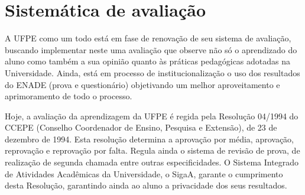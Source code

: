 \chapter{Sistemática de avaliação}
\label{cap9}

A UFPE como um todo está em fase de renovação de seu sistema de avaliação, buscando implementar neste uma avaliação que observe não só o aprendizado do aluno como também a sua opinião quanto às práticas pedagógicas adotadas na Universidade. Ainda, está em processo de institucionalização o uso dos resultados do ENADE (prova e questionário) objetivando um melhor aproveitamento e aprimoramento de todo o processo.

Hoje, a avaliação da aprendizagem da UFPE é regida pela Resolução 04/1994 do CCEPE (Conselho Coordenador de Ensino, Pesquisa e Extensão), de 23 de dezembro de 1994. Esta resolução determina a aprovação por média, aprovação, reprovação e reprovação por falta. Regula ainda o sistema de revisão de prova, de realização de segunda chamada entre outras especificidades. O Sistema Integrado de Atividades Acadêmicas da Universidade, o SigaA, garante o cumprimento desta Resolução, garantindo ainda ao aluno a privacidade dos seus resultados.

